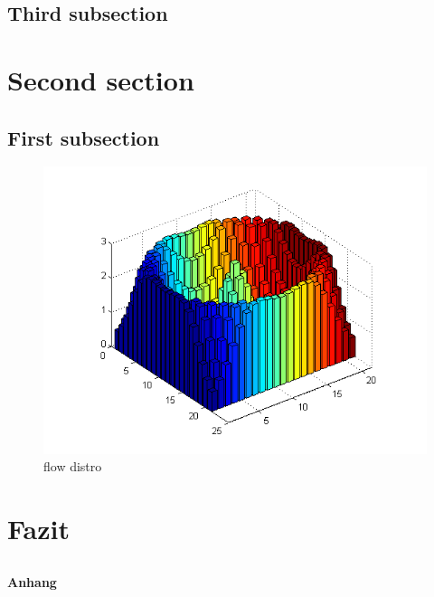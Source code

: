 \documentclass[11pt]{article} %
\newcommand{\InsertTitle}{This is a Dummy Title of Great Importance}
\begin{document}
	\subsection{Third subsection}	
		\blindtext

\section{Second section}
	\blindtext
	\subsection{First subsection}
		\Blindtext
		\begin{figure}[h]
		\centering
		\includegraphics[width=1\textwidth]{abb2.png}
		\caption{flow distro}
		\label{img:abb2}
		\end{figure}\par\blindtext

\section{Fazit}
	\blindtext
	

\begin{titlepage}
	\section*{}
	\renewcommand\cftsecfont{\scshape}
	\centering
	\vspace{3cm}
	{\huge\bfseries Anhang \par}
	
	\vfill
\end{titlepage}
\end{document}
